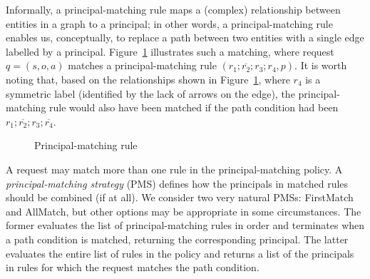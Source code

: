 \documentclass{article}
\newcommand{\comp}{\mathbin{;}}
\begin{document}
Informally, a principal-matching rule maps a (complex) relationship between entities in a graph to a principal;
in other words, a principal-matching rule enables us, conceptually, to replace a path between two entities with a single edge labelled by a principal.
Figure~\ref{img:principal_matching_rule} illustrates such a matching, where request $q = (s,o,a)$ matches a principal-matching rule $(r_1 \comp \overline{r_2} \comp r_3 \comp r_4, p)$. It is worth noting that, based on the relationships shown in Figure~\ref{img:principal_matching_rule}, where $r_4$ is a symmetric label (identified by the lack of arrows on the edge), the principal-matching rule would also have been matched if the path condition had been $r_1 \comp \overline{r_2} \comp r_3 \comp \overline{r_4}$.

\begin{figure}[!ht]\centering
    \caption{Principal-matching rule}\label{img:principal_matching_rule}
\end{figure}

A request may match more than one rule in the principal-matching policy.
A \emph{principal-matching strategy} (PMS) defines how the principals in matched rules should be combined (if at all).
We consider two very natural PMSs: \textsf{FirstMatch} and \textsf{AllMatch}, but other options may be appropriate in some circumstances.
The former evaluates the list of principal-matching rules in order and terminates when a path condition is matched, returning the corresponding principal.
The latter evaluates the entire list of rules in the policy and returns a list of the principals in rules for which the request matches the path condition.
\end{document}
